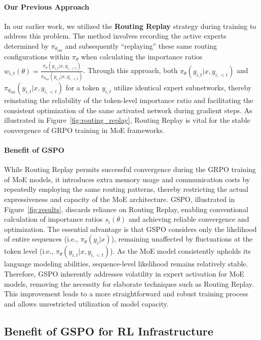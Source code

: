 \paragraph{Our Previous Approach} In our earlier work, we utilized the \textbf{Routing Replay} strategy during training to address this problem. The method involves recording the active experts determined by $\pi_{\theta_\text{old}}$ and subsequently “replaying” these same routing configurations within $\pi_{\theta}$ when calculating the importance ratios $w_{i,t}(\theta) = \frac{ \pi_{\theta} (y_{i,t} | x, y_{i,<t}) }{ \pi_{\theta_\text{old}} (y_{i,t} | x,y_{i,<t})}$. Through this approach, both $\pi_{\theta} (y_{i,t} | x, y_{i,<t})$ and $\pi_{\theta_\text{old}} (y_{i,t} | x,y_{i,<t})$ for a token $y_{i,t}$ utilize identical expert subnetworks, thereby reinstating the reliability of the token-level importance ratio and facilitating the consistent optimization of the same activated network during gradient steps. As illustrated in Figure~\ref{fig:routing_replay}, Routing Replay is vital for the stable convergence of GRPO training in MoE frameworks.

\paragraph{Benefit of GSPO} While Routing Replay permits successful convergence during the GRPO training of MoE models, it introduces extra memory usage and communication costs by repeatedly employing the same routing patterns, thereby restricting the actual expressiveness and capacity of the MoE architecture. GSPO, illustrated in Figure~\ref{fig:results}, discards reliance on Routing Replay, enabling conventional calculation of importance ratios $s_i(\theta)$ and achieving reliable convergence and optimization. The essential advantage is that GSPO considers only the likelihood of entire sequences (i.e., $\pi_{\theta} (y_i | x)$), remaining unaffected by fluctuations at the token level (i.e., $\pi_{\theta} (y_{i,t} | x, y_{i,<t})$). As the MoE model consistently upholds its language modeling abilities, sequence-level likelihood remains relatively stable. Therefore, GSPO inherently addresses volatility in expert activation for MoE models, removing the necessity for elaborate techniques such as Routing Replay. This improvement leads to a more straightforward and robust training process and allows unrestricted utilization of model capacity.

\subsection{Benefit of GSPO for RL Infrastructure}

